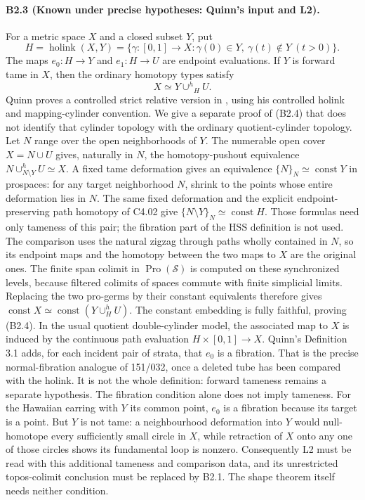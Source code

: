 \paragraph{B2.3 (Known under precise hypotheses: Quinn's input and L2).}
For a metric space $X$ and a closed subset $Y$, put
\[
 H=\operatorname{holink}(X,Y)
  =\{\gamma:[0,1]\to X:\gamma(0)\in Y,
                 \ \gamma(t)\notin Y\ (t>0)\}.
\]
The maps $e_0:H\to Y$ and $e_1:H\to U$ are endpoint evaluations.
If $Y$ is forward tame in $X$, then the ordinary homotopy types satisfy
\[
 X\simeq Y\mathbin{\cup^h}_{H}U.
 \tag{B2.4}
\]
Quinn proves a controlled strict relative version in
\cite[Lemma 2.4(2)]{Quinn1988}, using his controlled holink and
mapping-cylinder convention. We give a separate proof of (B2.4)
that does not identify that cylinder topology with the ordinary
quotient-cylinder topology. Let $N$ range over the open neighborhoods
of $Y$. The numerable open cover $X=N\cup U$ gives, naturally in $N$,
the homotopy-pushout equivalence
$N\cup^h_{N\setminus Y}U\simeq X$.
A fixed tame deformation gives an equivalence
$\{N\}_N\simeq\operatorname{const}Y$ in prospaces: for any target
neighborhood $N$, shrink to the points whose entire deformation lies
in $N$. The same fixed deformation and the explicit endpoint-preserving
path homotopy of C4.02 give
$\{N\setminus Y\}_N\simeq\operatorname{const}H$.
Those formulas need only tameness of this pair; the fibration part
of the HSS definition is not used. The comparison uses the natural
zigzag through paths wholly contained in $N$, so its endpoint maps
and the homotopy between the two maps to $X$ are the original ones.
The finite span colimit in $\operatorname{Pro}(\mathcal S)$ is
computed on these synchronized levels, because filtered colimits
of spaces commute with finite simplicial limits. Replacing the two
pro-germs by their constant equivalents therefore gives
$\operatorname{const}X\simeq
\operatorname{const}(Y\cup^h_HU)$.
The constant embedding is fully faithful, proving (B2.4).
In the usual quotient double-cylinder model, the associated map to
$X$ is induced by the continuous path evaluation
$H\times[0,1]\to X$.
Quinn's Definition 3.1 adds, for each incident pair of strata, that
$e_0$ is a fibration. That is the precise normal-fibration analogue of
151/032, once a deleted tube has been compared with the holink. It is
not the whole definition: forward tameness remains a separate
hypothesis. The fibration condition alone does not imply tameness.
For the Hawaiian earring with $Y$ its common point, $e_0$ is a fibration
because its target is a point. But $Y$ is not tame: a neighbourhood
deformation into $Y$ would null-homotope every sufficiently small
circle in $X$, while retraction of $X$ onto any one of those circles
shows its fundamental loop is nonzero. Consequently L2 must be read
with this additional tameness and comparison data, and its unrestricted
topos-colimit conclusion must be replaced by B2.1. The shape theorem
itself needs neither condition.

